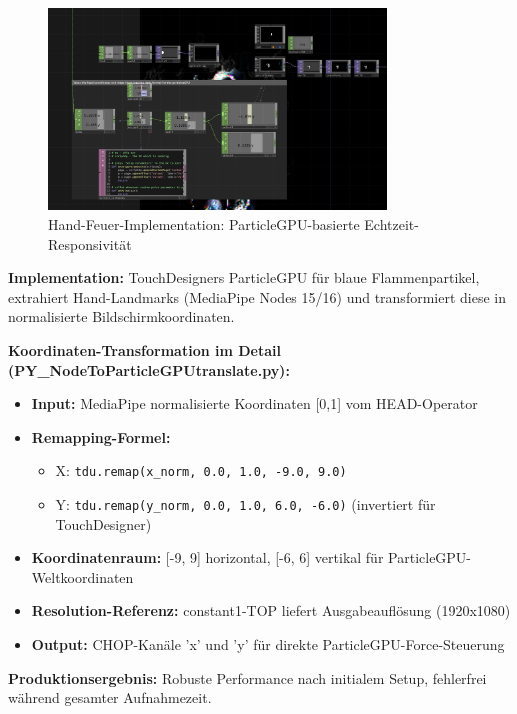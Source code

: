 \begin{figure}[h]
    \centering
    \includegraphics[width=0.8\textwidth]{images/docupictures/NoisyBlob_HEAD_to_ParticleGPU_Translate.png}
    \caption{Hand-Feuer-Implementation: ParticleGPU-basierte Echtzeit-Responsivität}
    \label{fig:hand_fire_system}
\end{figure}

\textbf{Implementation:} TouchDesigners ParticleGPU für blaue Flammenpartikel, extrahiert Hand-Landmarks (MediaPipe Nodes 15/16) und transformiert diese in normalisierte Bildschirmkoordinaten.

\textbf{Koordinaten-Transformation im Detail (PY\_NodeToParticleGPUtranslate.py):}
\begin{itemize}
    \item \textbf{Input:} MediaPipe normalisierte Koordinaten [0,1] vom HEAD-Operator
    \item \textbf{Remapping-Formel:} 
    \begin{itemize}
        \item X: \texttt{tdu.remap(x\_norm, 0.0, 1.0, -9.0, 9.0)}
        \item Y: \texttt{tdu.remap(y\_norm, 0.0, 1.0, 6.0, -6.0)} (invertiert für TouchDesigner)
    \end{itemize}
    \item \textbf{Koordinatenraum:} [-9, 9] horizontal, [-6, 6] vertikal für ParticleGPU-Weltkoordinaten
    \item \textbf{Resolution-Referenz:} constant1-TOP liefert Ausgabeauflösung (1920x1080)
    \item \textbf{Output:} CHOP-Kanäle 'x' und 'y' für direkte ParticleGPU-Force-Steuerung
\end{itemize}

\textbf{Produktionsergebnis:} Robuste Performance nach initialem Setup, fehlerfrei während gesamter Aufnahmezeit.

